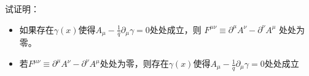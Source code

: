 \documentclass[CJK]{beamer}
\begin{document}
\begin{frame}
\bch
试证明：
\begin{itemize}
\item{如果存在$\gamma(x)$使得$A_\mu - \frac{1}{q}\partial_\mu\gamma = 0$处处成立，则
$F^{\mu\nu} \equiv \partial^\mu A^\nu - \partial^\nu A^\mu$ 处处为零。}
\item{若$F^{\mu\nu} \equiv \partial^\mu A^\nu - \partial^\nu A^\mu$处处为零，则存在$\gamma(x)$使得$A_\mu - \frac{1}{q}\partial_\mu\gamma = 0$处处成立}
\end{itemize}
\ech
\end{frame}

\begin{frame}
\chtitle{}
\bch
\ech
\end{frame}

\begin{frame}
\chtitle{}
\bch
\ech
\end{frame}

\begin{frame}
\chtitle{}
\bch
\ech
\end{frame}

\begin{frame}
\chtitle{}
\bch
\ech
\end{frame}

\begin{frame}
\chtitle{}
\bch
\ech
\end{frame}

\begin{frame}
\chtitle{}
\bch
\ech
\end{frame}

\begin{frame}
\chtitle{}
\bch
\ech
\end{frame}
\end{document}
